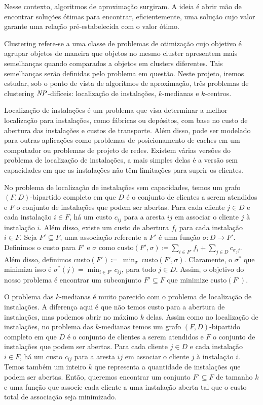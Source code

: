 \documentclass[12pt]{article}
\begin{document}
Nesse contexto, algoritmos de aproximação surgiram. A ideia é abrir mão de encontrar soluções ótimas para encontrar, eficientemente, uma solução cujo valor garante uma relação pré-estabelecida com o valor ótimo. 

Clustering refere-se a uma classe de problemas de otimização cujo objetivo é agrupar objetos de maneira que objetos no mesmo cluster apresentem mais semelhanças quando comparados a objetos em clusters diferentes. Tais semelhanças serão definidas pelo problema em questão. Neste projeto, iremos estudar, sob o ponto de vista de algoritmos de aproximação, três problemas de clustering $\mathit{NP}$-difíceis: localização de instalações, $k$-medianas e $k$-centros. 

Localização de instalações é um problema que visa determinar a melhor localização para instalações, como fábricas ou depósitos, com base no custo de abertura das instalações e custos de transporte. Além disso, pode ser modelado para outras aplicações como problemas de posicionamento de caches em um computador ou problemas de projeto de redes.
Existem várias versões do problema de localização de instalações, a mais simples delas é a versão sem capacidades em que as instalações não têm limitações para suprir os clientes.

No problema de localização de instalações sem capacidades, temos um grafo $(F,D)$-bipartido completo em que $D$ é o conjunto de clientes a serem atendidos e $F$ o conjunto de instalações que podem ser abertas. Para cada cliente $j \in D$ e cada instalação $i \in F$, há um custo $c_{ij}$ para a aresta $ij$ em associar o cliente $j$ à instalação $i$. Além disso, existe um custo de abertura $f_i$ para cada instalação $i \in F$. Seja $F' \subseteq F$, uma associação referente a $F'$ é uma função $\sigma : D \to F'$. Definimos o custo para $F'$ e $\sigma$ como $\text{custo}(F',\sigma)\coloneqq \sum_{ i \in F'} f_i + \sum_{j \in D} c_{\sigma_{j}j}$. Além disso, definimos custo$(F') \coloneqq~\min_{\sigma}~\text{custo}(F',\sigma)$. Claramente, o $\sigma^*$ que minimiza isso é $\sigma^*(j) = \min_{i \in F'} c_{ij}$, para todo $j \in D$. Assim, o objetivo do nosso problema é encontrar um subconjunto $F' \subseteq F$ que minimize custo$(F')$.

O problema das $k$-medianas é muito parecido com o problema de localização de instalações. A diferença aqui é que não temos custo para a abertura de instalações, mas podemos abrir no máximo $k$ delas. 
Assim como no localização de instalações, no problema das $k$-medianas temos um grafo $(F,D)$-bipartido completo em que $D$ é o conjunto de clientes a serem atendidos e $F$ o conjunto de instalações que podem ser abertas. Para cada cliente $j \in D$ e cada instalação $i \in F$, há um custo $c_{ij}$ para a aresta $ij$ em associar o cliente $j$ à instalação $i$. Temos também um inteiro $k$ que representa a quantidade de instalações que podem ser abertas. Então, queremos encontrar um conjunto $F' \subseteq F$ de tamanho $k$ e uma função que associe cada cliente a uma instalação aberta tal que o custo total de associação seja minimizado.
\end{document}
